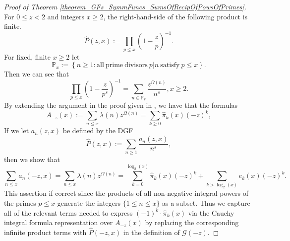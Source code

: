 \documentclass[11pt,reqno,a4letter]{article}
\numberwithin{figure}{section}
\numberwithin{table}{section}
\theoremstyle{plain}
\numberwithin{theorem}{section}
\theoremstyle{definition}
\newcommand{\NBRef}[1]{}
\begin{document}
\NBRef{A06-2020-04-26} 
\begin{proof}[Proof of Theorem \ref{theorem_GFs_SymmFuncs_SumsOfRecipOfPowsOfPrimes}] 
\label{proofOf_theorem_GFs_SymmFuncs_SumsOfRecipOfPowsOfPrimes} 
For $0 \leq z < 2$ and integers $x \geq 2$, 
the right-hand-side of the following product is finite. 
\[
\widehat{P}(z, x) := \prod_{p \leq x} \left(1 - \frac{z}{p}\right)^{-1}. 
\]
For fixed, finite $x \geq 2$ let 
\[
\mathbb{P}_x := \left\{n \geq 1: \mathrm{ all\ prime\ divisors\ } 
     p|n \mathrm{\ satisfy\ } p \leq x\right\}. 
\]
Then we can see that 
\begin{equation} 
\label{eqn_proof_tag_PHatFiniteTruncProdFactorOfGz_v2} 
\prod_{p \leq x} \left(1 - \frac{z}{p^s}\right)^{-1} = \sum_{n \in \mathbb{P}_x} 
     \frac{z^{\Omega(n)}}{n^s}, x \geq 2. 
\end{equation} 
By extending the argument in the proof given in 
\cite[\S 7.4]{MV}, we have that the formulas 
\[
A_{-z}(x) := \sum_{n \leq x} \lambda(n) z^{\Omega(n)} = 
     \sum_{k \geq 0} \widehat{\pi}_k(x) (-z)^k, 
\] 
If we let $a_n(z, x)$ be defined by the DGF 
\[
\widehat{P}(z, x) := \sum_{n \geq 1} \frac{a_n(z, x)}{n^s}, 
\]
then we show that 
\[
\sum_{n \leq x} a_n(-z, x) = \sum_{n \leq x} \lambda(n) z^{\Omega(n)} = 
     \sum_{k=0}^{\log_2(x)} \widehat{\pi}_k(x) (-z)^k + 
     \sum_{k > \log_2(x)} e_k(x) (-z)^{k}. 
\]
This assertion if correct since the products of all non-negative integral powers of the 
primes $p \leq x$ generate the integers $\{1 \leq n \leq x\}$ as a subset. 
Thus we capture all of the relevant terms needed to express 
$(-1)^{k} \cdot \widehat{\pi}_k(x)$ 
via the Cauchy integral formula representation over $A_{-z}(x)$ by 
replacing the corresponding infinite product terms with 
$\widehat{P}(-z, x)$ in the definition of $\mathcal{G}(-z)$. 


\end{proof}
\end{document}
